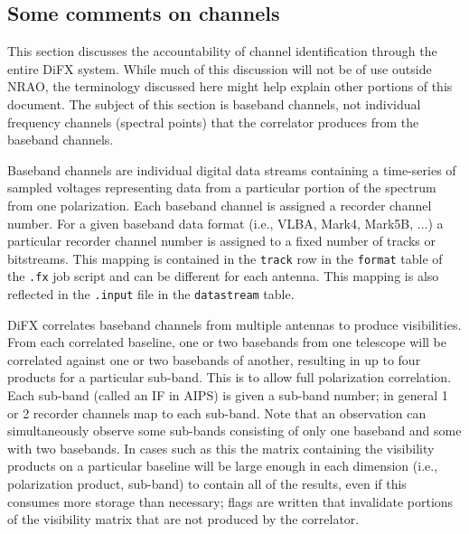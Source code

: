 \subsection{Some comments on channels}

This section discusses the accountability of channel identification through the entire DiFX system.
While much of this discussion will not be of use outside NRAO, the terminology discussed here might help explain other portions of this document.  
The subject of this section is baseband channels, not individual frequency channels (spectral points) that the correlator produces from the baseband channels.

Baseband channels are individual digital data streams containing a time-series of sampled voltages representing data from a particular portion of the spectrum from one polarization.
Each baseband channel is assigned a recorder channel number.
For a given baseband data format (i.e., VLBA, Mark4, Mark5B, ...) a particular recorder channel number is assigned to a fixed number of tracks or bitstreams.
This mapping is contained in the {\tt track} row in the {\tt format} table of the {\tt .fx} job script and can be different for each antenna.
This mapping is also reflected in the {\tt .input} file in the {\tt datastream} table.

DiFX correlates baseband channels from multiple antennas to produce visibilities.
From each correlated baseline, one or two basebands from one telescope will be correlated against one or two basebands of another, resulting in up to four products for a particular sub-band.
This is to allow full polarization correlation.
Each sub-band (called an IF in AIPS) is given a sub-band number; in general 1 or 2 recorder channels map to each sub-band.
Note that an observation can simultaneously observe some sub-bands consisting of only one baseband and some with two basebands.
In cases such as this the matrix containing the visibility products on a particular baseline will be large enough in each dimension (i.e., polarization product, sub-band) to contain all of the results, even if this consumes more storage than necessary; flags are written that invalidate portions of the visibility matrix that are not produced by the correlator.  
